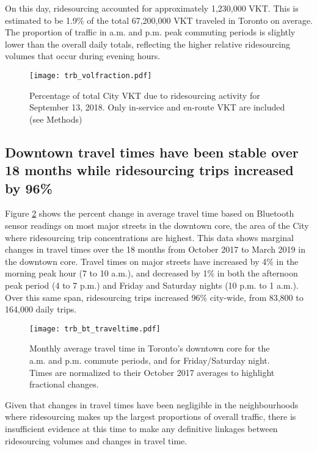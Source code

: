 \documentclass[]{trbunofficial_bdit_final}
\begin{document}
On this day, ridesourcing accounted for approximately 1,230,000 VKT. This is
estimated to be 1.9\% of the total 67,200,000 VKT traveled in Toronto on average.
The proportion of traffic in a.m. and p.m. peak commuting periods is slightly
lower than the overall daily totals, reflecting the higher relative ridesourcing
volumes that occur during evening hours.

\begin{figure}
\centering
\texttt{[image: trb\_volfraction.pdf]}
\caption{Percentage of total City VKT due to ridesourcing activity for September 13,
2018. Only in-service and en-route VKT are included (see Methods)
\label{fig:volfraction}}
\end{figure}

\hypertarget{downtown-travel-times-have-been-stable-over-18-months-while-ridesourcing-trips-increased-by-96}{%
\subsection{Downtown travel times have been stable over 18 months while ridesourcing trips increased by 96\%}\label{downtown-travel-times-have-been-stable-over-18-months-while-ridesourcing-trips-increased-by-96}}

Figure \ref{fig:bt_traveltime} shows the percent change in average travel time
based on Bluetooth sensor readings on most major streets in the downtown core,
the area of the City where ridesourcing trip concentrations are highest. This
data shows marginal changes in travel times over the 18 months from October
2017 to March 2019 in the downtown core. Travel times on major streets have
increased by 4\% in the morning peak hour (7 to 10 a.m.), and decreased by 1\% in
both the afternoon peak period (4 to 7 p.m.) and Friday and Saturday nights (10
p.m. to 1 a.m.). Over this same span, ridesourcing trips increased 96\%
city-wide, from 83,800 to 164,000 daily trips.

\begin{figure}
\centering
\texttt{[image: trb\_bt\_traveltime.pdf]}
\caption{Monthly average travel time in Toronto's downtown core for the a.m. and p.m.
commute periods, and for Friday/Saturday night. Times are normalized to their
October 2017 averages to highlight fractional changes.
\label{fig:bt_traveltime}}
\end{figure}

Given that changes in travel times have been negligible in the neighbourhoods
where ridesourcing makes up the largest proportions of overall traffic, there
is insufficient evidence at this time to make any definitive linkages between
ridesourcing volumes and changes in travel time.
\end{document}
